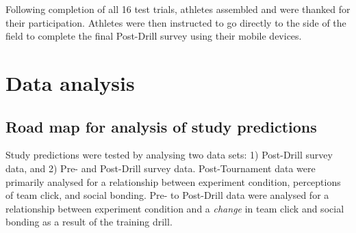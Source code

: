 \begin{CJK}{UTF8}{gbsn}
Following completion of all 16 test trials, athletes assembled and were thanked for their participation.  Athletes were then instructed to go directly to the side of the field to complete the final Post-Drill survey using their mobile devices.




\clearpage
\section{Data analysis}


\subsection{Road map for analysis of study predictions}

Study predictions were tested by analysing two data sets: 1) Post-Drill survey data, and 2) Pre- and Post-Drill survey data.  Post-Tournament data were primarily analysed for a relationship between experiment condition, perceptions of team click, and social bonding.  Pre- to Post-Drill data were analysed for a relationship between experiment condition and a \textit{change} in team click and social bonding as a result of the training drill.


\end{CJK}
